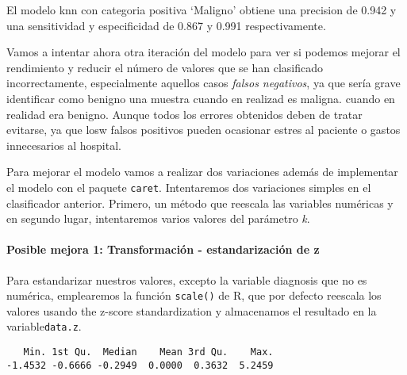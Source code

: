 \documentclass[
]{article}
\newenvironment{Shaded}{\begin{snugshade}}{\end{snugshade}}
\newcommand{\CommentTok}[1]{\textcolor[rgb]{0.56,0.35,0.01}{\textit{#1}}}
\newcommand{\DecValTok}[1]{\textcolor[rgb]{0.00,0.00,0.81}{#1}}
\newcommand{\KeywordTok}[1]{\textcolor[rgb]{0.13,0.29,0.53}{\textbf{#1}}}
\newcommand{\NormalTok}[1]{#1}
\newcommand{\OperatorTok}[1]{\textcolor[rgb]{0.81,0.36,0.00}{\textbf{#1}}}
\newcommand{\StringTok}[1]{\textcolor[rgb]{0.31,0.60,0.02}{#1}}
\let\oldparagraph\paragraph
\renewcommand{\paragraph}[1]{\oldparagraph{#1}\mbox{}}
\begin{document}
El modelo knn con categoria positiva `Maligno' obtiene una precision de
0.942 y una sensitividad y especificidad de 0.867 y 0.991
respectivamente.

Vamos a intentar ahora otra iteración del modelo para ver si podemos
mejorar el rendimiento y reducir el número de valores que se han
clasificado incorrectamente, especialmente aquellos casos \emph{falsos
negativos}, ya que sería grave identificar como benigno una muestra
cuando en realizad es maligna. cuando en realidad era benigno. Aunque
todos los errores obtenidos deben de tratar evitarse, ya que losw falsos
positivos pueden ocasionar estres al paciente o gastos innecesarios al
hospital.

Para mejorar el modelo vamos a realizar dos variaciones además de
implementar el modelo con el paquete \texttt{caret}. Intentaremos dos
variaciones simples en el clasificador anterior. Primero, un método que
reescala las variables numéricas y en segundo lugar, intentaremos varios
valores del parámetro \emph{k}.

\hypertarget{posible-mejora-1-transformaciuxf3n---estandarizaciuxf3n-de-z}{%
\paragraph{Posible mejora 1: Transformación - estandarización de
z}\label{posible-mejora-1-transformaciuxf3n---estandarizaciuxf3n-de-z}}

Para estandarizar nuestros valores, excepto la variable diagnosis que no
es numérica, emplearemos la función \texttt{scale()} de R, que por
defecto reescala los valores usando the z-score standardization y
almacenamos el resultado en la variable\texttt{data.z}.

\begin{Shaded}
\end{Shaded}

\begin{verbatim}
   Min. 1st Qu.  Median    Mean 3rd Qu.    Max. 
-1.4532 -0.6666 -0.2949  0.0000  0.3632  5.2459 
\end{verbatim}
\end{document}
